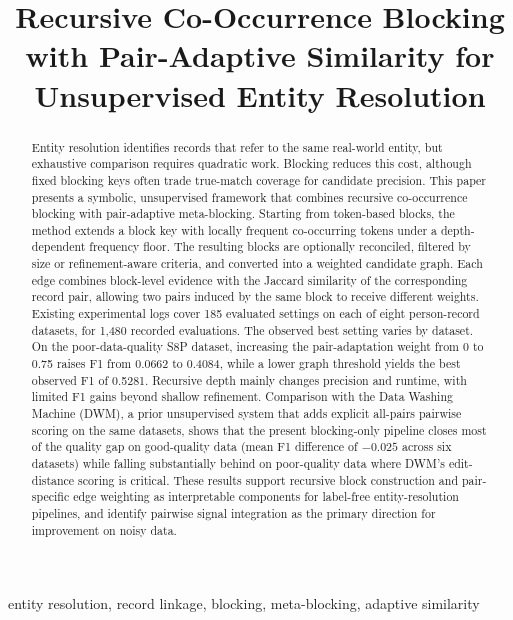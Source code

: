 \documentclass[conference]{IEEEtran}
\title{Recursive Co-Occurrence Blocking with Pair-Adaptive Similarity for Unsupervised Entity Resolution}
\author{%
\IEEEauthorblockN{Lou Angela Foua and Muzzakiruddin Ahmed Mohammed}
\IEEEauthorblockA{Department of Computer Science\\
University of Arkansas at Little Rock\\
Little Rock, Arkansas, USA\\
\{ldfoua1, mmohammed6\}@ualr.edu}
}
\begin{document}
\maketitle

\begin{abstract}
Entity resolution identifies records that refer to the same real-world entity, but exhaustive comparison requires quadratic work. Blocking reduces this cost, although fixed blocking keys often trade true-match coverage for candidate precision. This paper presents a symbolic, unsupervised framework that combines recursive co-occurrence blocking with pair-adaptive meta-blocking. Starting from token-based blocks, the method extends a block key with locally frequent co-occurring tokens under a depth-dependent frequency floor. The resulting blocks are optionally reconciled, filtered by size or refinement-aware criteria, and converted into a weighted candidate graph. Each edge combines block-level evidence with the Jaccard similarity of the corresponding record pair, allowing two pairs induced by the same block to receive different weights. Existing experimental logs cover 185 evaluated settings on each of eight person-record datasets, for 1,480 recorded evaluations. The observed best setting varies by dataset. On the poor-data-quality S8P dataset, increasing the pair-adaptation weight from 0 to 0.75 raises F1 from 0.0662 to 0.4084, while a lower graph threshold yields the best observed F1 of 0.5281. Recursive depth mainly changes precision and runtime, with limited F1 gains beyond shallow refinement. Comparison with the Data Washing Machine (DWM), a prior unsupervised system that adds explicit all-pairs pairwise scoring on the same datasets, shows that the present blocking-only pipeline closes most of the quality gap on good-quality data (mean F1 difference of $-0.025$ across six datasets) while falling substantially behind on poor-quality data where DWM's edit-distance scoring is critical. These results support recursive block construction and pair-specific edge weighting as interpretable components for label-free entity-resolution pipelines, and identify pairwise signal integration as the primary direction for improvement on noisy data.
\end{abstract}

\begin{IEEEkeywords}
entity resolution, record linkage, blocking, meta-blocking, adaptive similarity
\end{IEEEkeywords}
\end{document}
